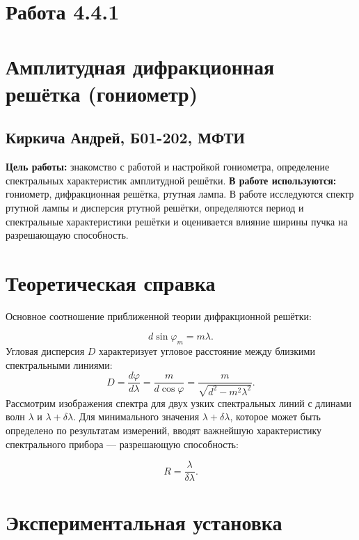 


\section*{Работа 4.4.1}	
\section*{Амплитудная дифракционная решётка (гониометр)}
\subsection*{Киркича Андрей, Б01-202, МФТИ}
\n\n
\textbf{Цель работы: }
знакомство с работой и настройкой гониометра, определение спектральных характеристик амплитудной решётки.
	\n\n
	\textbf{В работе используются: }
гониометр, дифракционная решётка, ртутная лампа.
\n\n
В работе исследуются спектр ртутной лампы и дисперсия ртутной решётки, определяются период и спектральные характеристики решётки и оценивается влияние ширины пучка на разрешающаую способность.
\n
\section*{Теоретическая справка}

Основное соотношение приближенной теории дифракционной решётки:

	\begin{equation}
	d\sin \varphi_m = m\lambda.
 	\label{main}
	\end{equation}
 \n
Угловая дисперсия $D$ характеризует угловое расстояние между близкими спектральными линиями:
	\begin{equation}
	D = \frac{d\varphi}{d\lambda} = \frac{m}{d \cos \varphi}=\frac{m}{\sqrt{d^{2}-m^{2} \lambda^{2}}}.
	\end{equation}
\n
Рассмотрим изображения спектра для двух узких спектральных линий с длинами волн $\lambda$ и $\lambda+\delta\lambda$. Для минимального значения $\lambda+\delta\lambda$, которое может быть определено по результатам измерений, вводят важнейшую характеристику спектрального прибора — разрешающую способность:

\begin{equation}
    R=\frac{\lambda}{\delta\lambda}.
\end{equation}


\section*{Экспериментальная установка}

